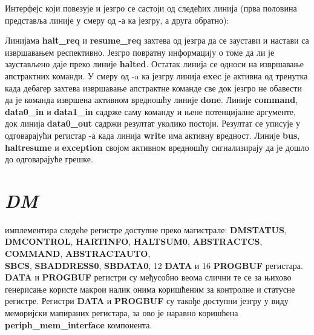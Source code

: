 Интерфејс који повезује  и језгро се састоји од следећих линија (прва половина представља линије у смеру од -а ка језгру, а друга обратно):



Линијама \textbf{halt\_req} и \textbf{resume\_req}  захтева од језгра да се заустави и настави са извршавањем респективно. Језгро повратну информацију о томе да ли је заустављено даје преко линије \textbf{halted}. Остатак линија се односи на извршавање апстрактних команди. У смеру од -a ка језгру линија \textbf{exec} је активна од тренутка када дебагер захтева извршавање апстрактне команде све док језгро не обавести  да је команда извршена активном вредношћу линије \textbf{done}. Линије \textbf{command}, \textbf{data0\_in} и \textbf{data1\_in} садрже саму команду и њене потенцијалне аргументе, док линија \textbf{data0\_out} садржи резултат уколико постоји. Резултат се уписује у одговарајући регистар -а када линија \textbf{write} има активну вредност.
Линије \textbf{bus}, \textbf{haltresume} и \textbf{exception} својом активном вредношћу сигнализирају да је дошло до одговарајуће грешке.\newpage

\section{\textit{\acrfull{DM}}}

 имплементира следеће регистре доступне преко  магистрале: \textbf{\acrshort{DMSTATUS}},\\ \textbf{\acrshort{DMCONTROL}}, \textbf{HARTINFO}, \textbf{\acrshort{HALTSUM}0}, \textbf{\acrshort{ABSTRACTCS}}, \textbf{COMMAND}, \textbf{ABSTRACTAUTO},\\ \textbf{\acrshort{SBCS}}, \textbf{\acrshort{SBADDRESS}0}, \textbf{\acrshort{SBDATA}0}, 12 \textbf{DATA} и 16 \textbf{\acrshort{PROGBUF}} регистара. \textbf{DATA} и \textbf{\acrshort{PROGBUF}} регистри су међусобно веома слични те се за њихово генерисање користе макрои налик онима коришћеним за контролне и статусне регистре. Регистри \textbf{DATA} и \textbf{\acrshort{PROGBUF}} су такође доступни језгру у виду меморијски мапираних регистара, за ово је наравно коришћена \textbf{periph\_mem\_interface} компонента.



